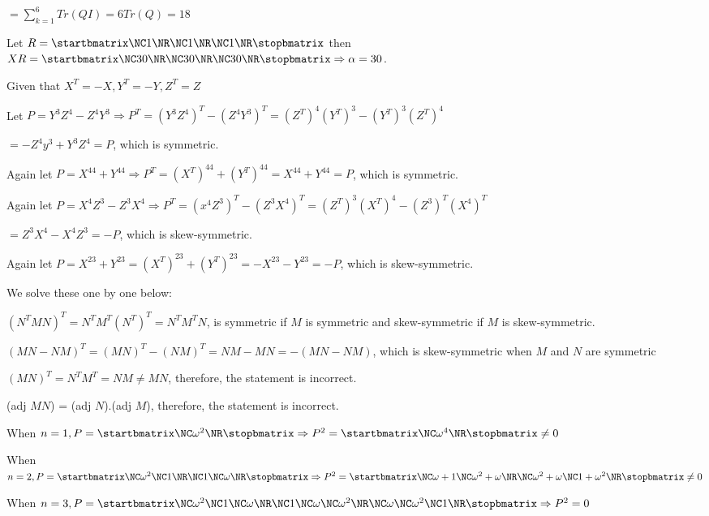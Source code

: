   $= \sum_{k = 1}^6Tr(QI) = 6Tr(Q) = 18$

  Let $R = \startbmatrix\NC 1\NR\NC 1\NR\NC 1\NR\stopbmatrix$ then $XR = \startbmatrix\NC 30\NR\NC 30\NR\NC
  30\NR\stopbmatrix\Rightarrow \alpha = 30$.
\item Given that $X^T = -X, Y^T = -Y, Z^T = Z$

  Let $P = Y^3Z^4 - Z^4Y^3\Rightarrow P^T = \left(Y^3Z^4\right)^T - \left(Z^4Y^3\right)^T
  = \left(Z^T\right)^4\left(Y^T\right)^3 - \left(Y^T\right)^3\left(Z^T\right)^4$

  $= -Z^4y^3 + Y^3Z^4 = P$, which is symmetric.

  Again let $P = X^{44} + Y^{44} \Rightarrow P^T = \left(X^T\right)^{44} + \left(Y^T\right)^{44} = X^{44} +
  Y^{44} = P$, which is symmetric.

  Again let $P = X^4Z^3 - Z^3X^4\Rightarrow P^T = \left(x^4Z^3\right)^T - \left(Z^3X^4\right)^T
  = \left(Z^T\right)^3\left(X^T\right)^4 - \left(Z^3\right)^T\left(X^4\right)^T$

  $= Z^3X^4 - X^4Z^3 = -P$, which is skew-symmetric.

  Again let $P = X^{23} + Y^{23} = \left(X^T\right)^{23} + \left(Y^T\right)^{23} = -X^{23} - Y^{23} = -P$,
  which is skew-symmetric.
\item We solve these one by one below:
  \startitemize[a]
  \item $\left(N^TMN\right)^T = N^TM^T\left(N^T\right)^T = N^TM^TN$, is symmetric if $M$ is symmetric and
    skew-symmetric if $M$ is skew-symmetric.
  \item $\left(MN - NM\right)^T = (MN)^T - (NM)^T = NM - MN = -(MN - NM)$, which is skew-symmetric when $M$
    and $N$ are symmetric
  \item $(MN)^T = N^TM^T = NM \neq MN$, therefore, the statement is incorrect.
  \item (adj $MN$) = (adj $N$).(adj $M$), therefore, the statement is incorrect.
  \stopitemize
\item When $n = 1, P = \startbmatrix\NC\omega^2\NR\stopbmatrix\Rightarrow P^2
  = \startbmatrix\NC\omega^4\NR\stopbmatrix\neq 0$

  When $n = 2, P = \startbmatrix\NC \omega^2\NC 1\NR\NC 1\NC \omega\NR\stopbmatrix\Rightarrow P^2
  = \startbmatrix\NC\omega + 1\NC \omega^2+\omega\NR\NC \omega^2 + \omega\NC 1 + \omega^2\NR\stopbmatrix\neq
  0$

  When $n = 3, P = \startbmatrix\NC \omega^2\NC 1\NC \omega\NR\NC
  1\NC\omega \NC \omega^2\NR\NC \omega\NC \omega^2\NC 1\NR\stopbmatrix \Rightarrow P^2= 0$

